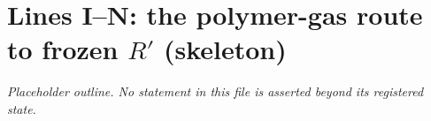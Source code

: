 \section{Lines I--N: the polymer-gas route to frozen \texorpdfstring{$R'$}{R'} (skeleton)}
\label{sec:lines-I-N-skeleton}
\emph{Placeholder outline. No statement in this file is asserted beyond its registered state.}

